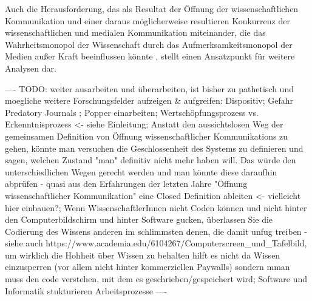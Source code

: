 Auch die Herausforderung, das als Resultat der Öffnung der wissenschaftlichen Kommunikation und einer daraus möglicherweise resultieren Konkurrenz der wissenschaftlichen und medialen Kommunikation miteinander, die das Wahrheitsmonopol der Wissenschaft durch das Aufmerksamkeitsmonopol der Medien außer Kraft beeinflussen könnte \cite{weingart_2005_wissenschaft}, stellt einen Ansatzpunkt für weitere Analysen dar.

---- TODO: weiter ausarbeiten und überarbeiten, ist bisher zu pathetisch und moegliche weitere Forschungsfelder aufzeigen & aufgreifen: Dispositiv; Gefahr Predatory Journals \cite{Beall_2012}; Popper einarbeiten; Wertschöpfungsprozess vs. Erkenntnisprozess <- siehe Einleitung; Anstatt den aussichtslosen Weg der gemeinsamen Definition von Öffnung wissenschaftlicher Kommunikations zu gehen, könnte man versuchen die Geschlossenheit des Systems zu definieren und sagen, welchen Zustand "man" definitiv nicht mehr haben will. Das würde den unterschiedlichen Wegen gerecht werden und man könnte diese daraufhin abprüfen - quasi aus den Erfahrungen der letzten Jahre "Öffnung wissenschaftlicher Kommunikation" eine Closed Definition ableiten <- vielleicht hier einbauen?; Wenn WissenschaftlerInnen nicht Coden können und nicht hinter den Computerbildschirm und hinter Software gucken, überlassen Sie die Codierung des Wissens anderen im schlimmsten denen, die damit unfug treiben - siehe auch https://www.academia.edu/6104267/Computerscreen_und_Tafelbild, um wirklich die Hohheit über Wissen zu behalten hilft es nicht da Wissen einzusperren (vor allem nicht hinter kommerziellen Paywalls) sondern mman muss den code verstehen, mit dem es geschrieben/gespeichert wird; Software und Informatik stukturieren Arbeitsprozesse \cite{Warnke_2012}  ----
